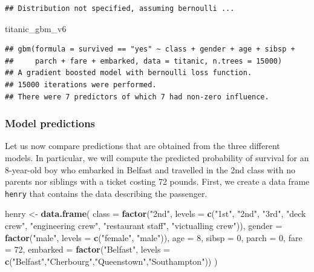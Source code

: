 \documentclass[12pt,]{krantz}
\newenvironment{Shaded}{\begin{snugshade}}{\end{snugshade}}
\newcommand{\DataTypeTok}[1]{\textcolor[rgb]{0.13,0.29,0.53}{#1}}
\newcommand{\DecValTok}[1]{\textcolor[rgb]{0.00,0.00,0.81}{#1}}
\newcommand{\KeywordTok}[1]{\textcolor[rgb]{0.13,0.29,0.53}{\textbf{#1}}}
\newcommand{\NormalTok}[1]{#1}
\newcommand{\StringTok}[1]{\textcolor[rgb]{0.31,0.60,0.02}{#1}}
\theoremstyle{definition}
\theoremstyle{definition}
\theoremstyle{definition}
\theoremstyle{remark}
\begin{document}
\begin{verbatim}
## Distribution not specified, assuming bernoulli ...
\end{verbatim}

\begin{Shaded}
\begin{Highlighting}[]
\NormalTok{titanic_gbm_v6}
\end{Highlighting}
\end{Shaded}

\begin{verbatim}
## gbm(formula = survived == "yes" ~ class + gender + age + sibsp + 
##     parch + fare + embarked, data = titanic, n.trees = 15000)
## A gradient boosted model with bernoulli loss function.
## 15000 iterations were performed.
## There were 7 predictors of which 7 had non-zero influence.
\end{verbatim}

\hypertarget{predictions_titanic}{%
\subsubsection{Model predictions}\label{predictions_titanic}}

Let us now compare predictions that are obtained from the three
different models. In particular, we will compute the predicted
probability of survival for an 8-year-old boy who embarked in Belfast
and travelled in the 2nd class with no parents nor siblings with a
ticket costing 72 pounds. First, we create a data frame \texttt{henry}
that contains the data describing the passenger.

\begin{Shaded}
\begin{Highlighting}[]
\NormalTok{henry <-}\StringTok{ }\KeywordTok{data.frame}\NormalTok{(}
            \DataTypeTok{class =} \KeywordTok{factor}\NormalTok{(}\StringTok{"2nd"}\NormalTok{, }\DataTypeTok{levels =} \KeywordTok{c}\NormalTok{(}\StringTok{"1st"}\NormalTok{, }\StringTok{"2nd"}\NormalTok{, }\StringTok{"3rd"}\NormalTok{, }\StringTok{"deck crew"}\NormalTok{, }\StringTok{"engineering crew"}\NormalTok{, }\StringTok{"restaurant staff"}\NormalTok{, }\StringTok{"victualling crew"}\NormalTok{)),}
            \DataTypeTok{gender =} \KeywordTok{factor}\NormalTok{(}\StringTok{"male"}\NormalTok{, }\DataTypeTok{levels =} \KeywordTok{c}\NormalTok{(}\StringTok{"female"}\NormalTok{, }\StringTok{"male"}\NormalTok{)),}
            \DataTypeTok{age =} \DecValTok{8}\NormalTok{,}
            \DataTypeTok{sibsp =} \DecValTok{0}\NormalTok{,}
            \DataTypeTok{parch =} \DecValTok{0}\NormalTok{,}
            \DataTypeTok{fare =} \DecValTok{72}\NormalTok{,}
            \DataTypeTok{embarked =} \KeywordTok{factor}\NormalTok{(}\StringTok{"Belfast"}\NormalTok{, }\DataTypeTok{levels =} \KeywordTok{c}\NormalTok{(}\StringTok{"Belfast"}\NormalTok{,}\StringTok{"Cherbourg"}\NormalTok{,}\StringTok{"Queenstown"}\NormalTok{,}\StringTok{"Southampton"}\NormalTok{))}
\NormalTok{)}
\end{Highlighting}
\end{Shaded}
\end{document}
